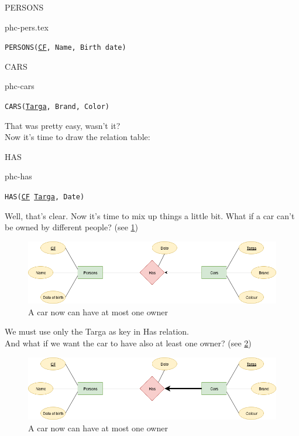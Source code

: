 \documentclass[class=book, crop=false, oneside]{standalone}
\begin{document}
\begin{minipage}{0.45\textwidth}
	PERSONS
	\begin{table}[H]
		\centering
		{phc-pers.tex}
	\end{table}
	\texttt{PERSONS(\underline{CF}, Name, Birth date)}
\end{minipage}
\hspace{.1\textwidth}
\begin{minipage}{.45\textwidth}
	CARS
	\begin{table}[H]
		\centering
		{phc-cars}
	\end{table}
	\texttt{CARS(\underline{Targa}, Brand, Color)}
\end{minipage}
\vskip 20pt
That was pretty easy, wasn't it?\\
Now it's time to draw the relation table:
\vskip 20pt
\begin{minipage}{.7\textwidth}
	HAS
	\begin{table}[H]
		{phc-has}
	\end{table}
	\texttt{HAS(\underline{CF} \underline{Targa}, Date)}
\end{minipage}
\vskip 20pt
Well, that's clear. Now it's time to mix up things a little bit.
What if a car can't be owned by different people? (see \ref{diagram1.01})
\begin{figure}[H]
	\centering
	\includegraphics[width=.9\textwidth,keepaspectratio]{diagram1_01.png}
	\caption{A car now can have at most one owner}
	\label{diagram1.01}
\end{figure}
We must use only the Targa as key in Has relation.
\\
And what if we want the car to have also at least one owner? (see \ref{diagram1_02})
\begin{figure}[H]
	\centering
	\includegraphics[width=.9\textwidth,keepaspectratio]{diagram1_02.png}
	\caption{A car now can have at most one owner}
	\label{diagram1_02}
\end{figure}
\end{document}
